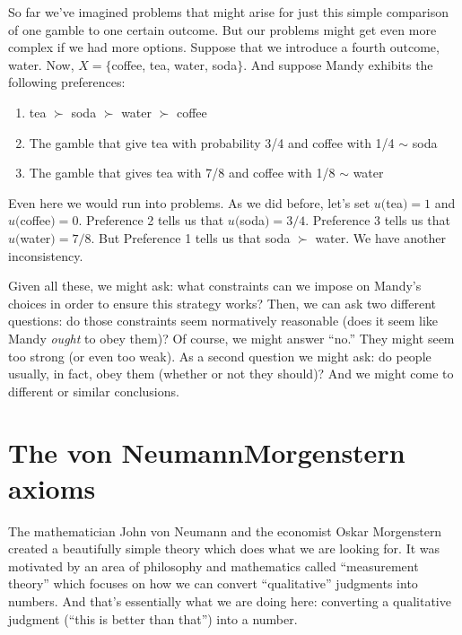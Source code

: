 So far we've imagined problems that might arise for just this simple comparison of one gamble to one certain outcome.  But our problems might get even more complex if we had more options.  Suppose that we introduce a fourth outcome, water.  Now, $X = \{$coffee, tea, water, soda$\}$.  And suppose Mandy exhibits the following preferences:
\begin{enumerate}
\item tea $\succ$ soda $\succ$ water $\succ$ coffee
\item The gamble that give tea with probability 3/4 and coffee with 1/4 $\sim$ soda
\item The gamble that gives tea with 7/8 and coffee with 1/8 $\sim$ water
\end{enumerate}
Even here we would run into problems. As we did before, let's set $u($tea$)=1$ and $u($coffee$)=0$. Preference 2 tells us that $u($soda$)=3/4$.  Preference 3 tells us that $u($water$)=7/8$.  But Preference 1 tells us that soda $\succ$ water. We have another inconsistency.


Given all these, we might ask: what constraints can we impose on Mandy's choices in order to ensure this strategy works?  Then, we can ask two different questions: do those constraints seem normatively reasonable (does it seem like Mandy {\it ought} to obey them)?  Of course, we might answer ``no.''  They might seem too strong (or even too weak). As a second question we might ask: do  people usually, in fact, obey them (whether or not they should)?  And we might come to different or similar conclusions.

\section{The von Neumann\breakslash Morgenstern axioms}

The mathematician John von Neumann and the economist Oskar Morgenstern created a beautifully simple theory which does what we are looking for.  It was motivated by an area of philosophy and mathematics called ``measurement theory'' which focuses on how we can convert ``qualitative'' judgments into numbers.  And that's essentially what we are doing here: converting a qualitative judgment (``this is better than that'') into a number.  

